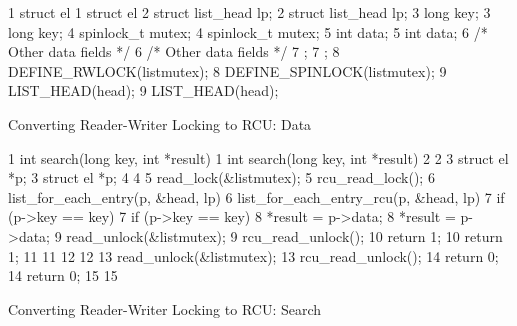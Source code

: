 \begin{listing*}
{ \scriptsize
\begin{verbbox}
 1 struct el {                           1 struct el {
 2   struct list_head lp;                2   struct list_head lp;
 3   long key;                           3   long key;
 4   spinlock_t mutex;                   4   spinlock_t mutex;
 5   int data;                           5   int data;
 6   /* Other data fields */             6   /* Other data fields */
 7 };                                    7 };
 8 DEFINE_RWLOCK(listmutex);             8 DEFINE_SPINLOCK(listmutex);
 9 LIST_HEAD(head);                      9 LIST_HEAD(head);
\end{verbbox}
}
\hspace*{0.9in}\OneColumnHSpace{-0.5in}
\IfEbookSize{\hspace*{-1.05in}}{}\theverbbox
\caption{Converting Reader-Writer Locking to RCU\@:
						    Data}
\label{lst:defer:Converting Reader-Writer Locking to RCU: Data}
\end{listing*}

\begin{listing*}
{ \scriptsize
\begin{verbbox}
 1 int search(long key, int *result)     1 int search(long key, int *result)
 2 {                                     2 {
 3   struct el *p;                       3   struct el *p;
 4                                       4
 5   read_lock(&listmutex);              5   rcu_read_lock();
 6   list_for_each_entry(p, &head, lp) { 6   list_for_each_entry_rcu(p, &head, lp) {
 7     if (p->key == key) {              7     if (p->key == key) {
 8       *result = p->data;              8       *result = p->data;
 9       read_unlock(&listmutex);        9       rcu_read_unlock();
10       return 1;                      10       return 1;
11     }                                11     }
12   }                                  12   }
13   read_unlock(&listmutex);           13   rcu_read_unlock();
14   return 0;                          14   return 0;
15 }                                    15 }
\end{verbbox}
}
\hspace*{0.9in}\OneColumnHSpace{-0.5in}
\IfEbookSize{\hspace*{-1.05in}}{}\theverbbox
\caption{Converting Reader-Writer Locking to RCU\@:
						    Search}
\label{lst:defer:Converting Reader-Writer Locking to RCU: Search}
\end{listing*}

